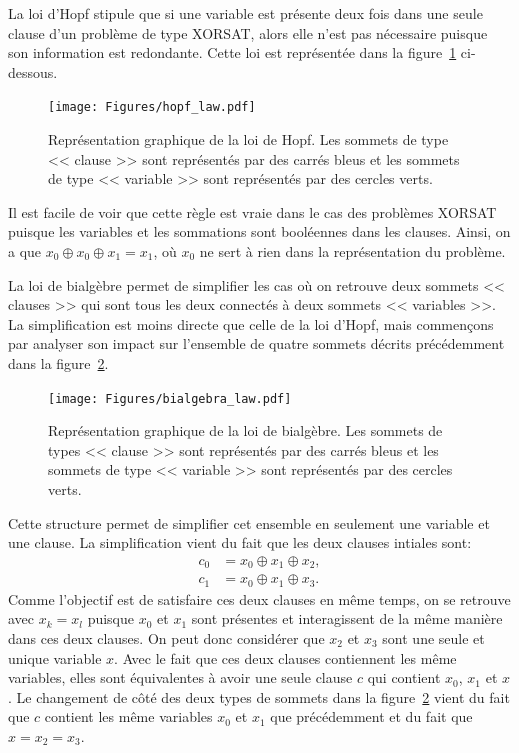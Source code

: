 La loi d'Hopf stipule que si une variable est présente deux fois dans une seule clause d'un problème de type XORSAT, alors elle n'est pas nécessaire puisque son information est redondante.
Cette loi est représentée dans la figure~\ref{fig:hopf-law} ci-dessous.
\begin{figure}[h]
    \centering
    \texttt{[image: Figures/hopf\_law.pdf]}
    \caption{Représentation graphique de la loi de Hopf. Les sommets de type << clause >> sont représentés par des carrés bleus et les sommets de type << variable >> sont représentés par des cercles verts.}
    \label{fig:hopf-law}
\end{figure}
Il est facile de voir que cette règle est vraie dans le cas des problèmes XORSAT puisque les variables et les sommations sont booléennes dans les clauses.
Ainsi, on a que $x_0 \oplus x_0 \oplus x_1 = x_1$, où $x_0$ ne sert à rien dans la représentation du problème.

La loi de bialgèbre permet de simplifier les cas où on retrouve deux sommets << clauses >> qui sont tous les deux connectés à deux sommets << variables >>.
La simplification est moins directe que celle de la loi d'Hopf, mais commençons par analyser son impact sur l'ensemble de quatre sommets décrits précédemment dans la figure~\ref{fig:bialgebra-law}.
\begin{figure}[h]
    \centering
    \texttt{[image: Figures/bialgebra\_law.pdf]}
    \caption{Représentation graphique de la loi de bialgèbre. Les sommets de types << clause >> sont représentés par des carrés bleus et les sommets de type << variable >> sont représentés par des cercles verts.}
    \label{fig:bialgebra-law}
\end{figure}
Cette structure permet de simplifier cet ensemble en seulement une variable et une clause.
La simplification vient du fait que les deux clauses intiales sont:
\begin{equation}
    \begin{split}
        c_0 &= x_0 \oplus x_1 \oplus x_2,\\
        c_1 &= x_0 \oplus x_1 \oplus x_3.
    \end{split}
\end{equation}
Comme l'objectif est de satisfaire ces deux clauses en même temps, on se retrouve avec $x_k  = x_l$ puisque $x_0$ et $x_1$ sont présentes et interagissent de la même manière dans ces deux clauses.
On peut donc considérer que $x_2$ et $x_3$ sont une seule et unique variable $x$.
Avec le fait que ces deux clauses contiennent les même variables, elles sont équivalentes à avoir une seule clause $c$ qui contient $x_0$, $x_1$ et $x$.
Le changement de côté des deux types de sommets dans la figure~\ref{fig:bialgebra-law} vient du fait que $c$ contient les même variables $x_0$ et $x_1$ que précédemment et du fait que $x = x_2 = x_3$.


